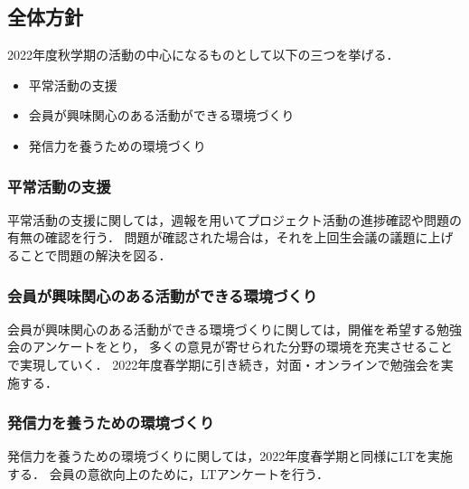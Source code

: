 \subsection*{全体方針}

2022年度秋学期の活動の中心になるものとして以下の三つを挙げる．
\begin{itemize}
  \item 平常活動の支援
  \item 会員が興味関心のある活動ができる環境づくり
  \item 発信力を養うための環境づくり
\end{itemize}

\subsubsection*{平常活動の支援}
平常活動の支援に関しては，週報を用いてプロジェクト活動の進捗確認や問題の有無の確認を行う．
問題が確認された場合は，それを上回生会議の議題に上げることで問題の解決を図る．

\subsubsection*{会員が興味関心のある活動ができる環境づくり}
会員が興味関心のある活動ができる環境づくりに関しては，開催を希望する勉強会のアンケートをとり，
多くの意見が寄せられた分野の環境を充実させることで実現していく．
2022年度春学期に引き続き，対面・オンラインで勉強会を実施する．

\subsubsection*{発信力を養うための環境づくり}
発信力を養うための環境づくりに関しては，2022年度春学期と同様にLTを実施する．
会員の意欲向上のために，LTアンケートを行う．